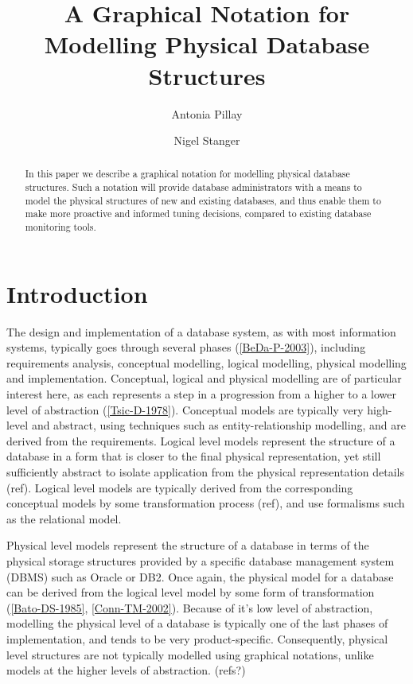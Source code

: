 \documentclass{llncs}
\title{A Graphical Notation for Modelling Physical Database Structures}
\author{Antonia Pillay \and Nigel Stanger}
\institute{Department of Information Science, University of Otago, Dunedin, New Zealand \email{nstanger@infoscience.otago.ac.nz}}
\begin{document}
\maketitle

\begin{abstract}
In this paper we describe a graphical notation for modelling physical database structures. Such a notation will provide database administrators with a means to model the physical structures of new and existing databases, and thus enable them to make more proactive and informed tuning decisions, compared to existing database monitoring tools.
\end{abstract}


\section{Introduction}

The design and implementation of a database system, as with most information systems, typically goes through several phases (\ref{BeDa-P-2003}), including requirements analysis, conceptual modelling, logical modelling, physical modelling and implementation. Conceptual, logical and physical modelling are of particular interest here, as each represents a step in a progression from a higher to a lower level of abstraction (\ref{Tsic-D-1978}). Conceptual models are typically very high-level and abstract, using techniques such as entity-relationship modelling, and are derived from the requirements. Logical level models represent the structure of a database in a form that is closer to the final physical representation, yet still sufficiently abstract to isolate application from the physical representation details (ref). Logical level models are typically derived from the corresponding conceptual models by some transformation process (ref), and use formalisms such as the relational model.

Physical level models represent the structure of a database in terms of the physical storage structures provided by a specific database management system (DBMS) such as Oracle or DB2. Once again, the physical model for a database can be derived from the logical level model by some form of transformation (\ref{Bato-DS-1985}, \ref{Conn-TM-2002}). Because of it's low level of abstraction, modelling the physical level of a database is typically one of the last phases of implementation, and tends to be very product-specific. Consequently, physical level structures are not typically modelled using graphical notations, unlike models at the higher levels of abstraction. (refs?)
\end{document}
